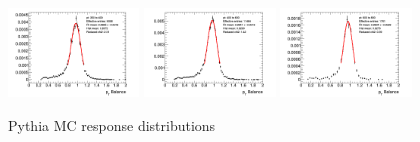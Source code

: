 \begin{figure}[htb!]
    \includegraphics[width=0.31\textwidth]{plots/insitu/fits_pythia_zee_nominal/Zeejet_Nominal_Bin8.png}
    \includegraphics[width=0.31\textwidth]{plots/insitu/fits_pythia_zee_nominal/Zeejet_Nominal_Bin9.png}
    \includegraphics[width=0.31\textwidth]{plots/insitu/fits_pythia_zee_nominal/Zeejet_Nominal_Bin10.png}
    \caption{Pythia MC \zeejet response distributions \label{fig:App:zeepythiafits}}
\end{figure}

